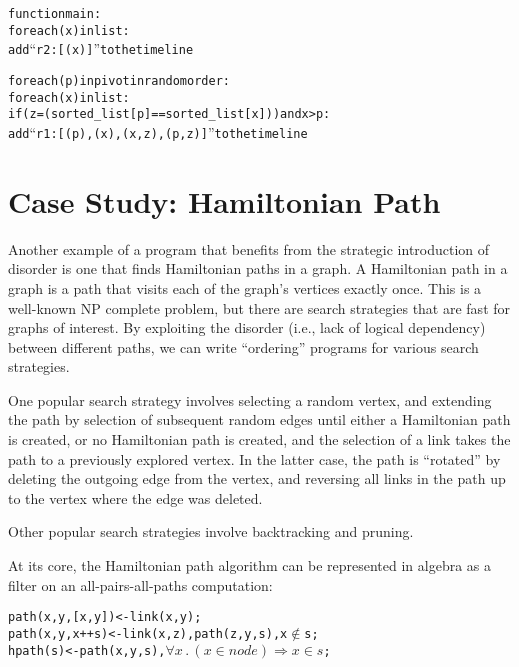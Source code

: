 \begin{alltt}
function main:
   for each (x) in list:
      add ``r2 : [(x)]'' to the timeline

   for each (p) in pivot in random order:
      for each (x) in list:
         if (z = (sorted_list[p] == sorted_list[x])) and x > p:
            add ``r1 : [(p),(x),(x,z),(p,z)]'' to the timeline
\end{alltt}


\section{Case Study: Hamiltonian Path}

Another example of a program that benefits from the strategic introduction of disorder is one that finds Hamiltonian paths in a graph.  A Hamiltonian path in a graph is a path that visits each of the graph's vertices exactly once.  This is a well-known NP complete problem, but there are search strategies that are fast for graphs of interest.  By exploiting the disorder (i.e., lack of logical dependency) between different paths, we can write ``ordering'' programs for various search strategies.

One popular search strategy involves selecting a random vertex, and extending the path by selection of subsequent random edges until either a Hamiltonian path is created, or no Hamiltonian path is created, and the selection of a link takes the path to a previously explored vertex.  In the latter case, the path is ``rotated'' by deleting the outgoing edge from the vertex, and reversing all links in the path up to the vertex where the edge was deleted.

Other popular search strategies involve backtracking and pruning.


At its core, the Hamiltonian path algorithm can be represented in algebra as a filter on an all-pairs-all-paths computation:

\begin{alltt}
path(x,y,[x,y]) <- link(x,y);
path(x,y,x ++ s) <- link(x,z), path(z,y,s), x \(\not\in\) s;
hpath(s) <- path(x,y,s), \(\forall x \, . \, (x \in node) \Rightarrow x \in s \);
\end{alltt}

